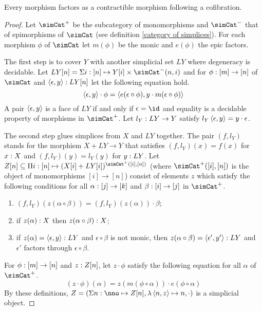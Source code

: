 \documentclass[csh.tex]{subfiles}
\begin{document}
\begin{proposition} Every morphism factors as a contractible morphism following a cofibration. \label{factor1} \end{proposition}

\begin{proof}
Let $\simCat^+$ be the subcategory of monomorphisms and $\simCat^-$ that of epimorphisms of $\simCat$ (see definition \ref{category of simplices}). For each morphism $\phi$ of $\simCat$ let $m(\phi)$ be the monic and $e(\phi)$ the epic factors.

The first step is to cover $Y$ with another simplicial set $LY$ where degeneracy is decidable.
Let $LY[n] = \coproduct{i\of[n]}{Y[i]\times\simCat^-(n,i)}$ and for $\phi: [m]\to [n]$ of $\simCat$ and $\left\langle \epsilon,y \right\rangle: LY[n]$ let the following equation hold.
\[\left\langle \epsilon,y \right\rangle\cdot \phi=\left\langle e(\epsilon\circ \phi),y\cdot m(\epsilon\circ\phi) \right\rangle\]
A pair $\left\langle \epsilon,y \right\rangle$ is a face of $LY$ if and only if $\epsilon=\id$ and equality is a decidable property of morphisms in $\simCat^+$.
Let $l_Y: LY\to Y$ satisfy $l_Y\left\langle \epsilon,y \right\rangle=y\cdot\epsilon$.


The second step glues simplices from $X$ and $LY$ together.
The pair $(f,l_Y)$ stands for the morphism $X+LY\to Y$ that satisfies $(f,l_Y)(x)=f(x)$ for $x: X$ and $(f,l_Y)(y) = l_Y(y)$ for $y: LY$.
Let $Z[n]\subseteq \product{i\of[n]}{(X[i]+LY[i])^{\simCat^+([i],[n])}}$ (where $\simCat^+([i],[n])$ is the object of monomorphisms $[i]\to [n]$) consist of elements $z$ which satisfy the following conditions for all $\alpha: [j]\to [k]$ and $\beta: [i]\to[j]$ in $\simCat^+$.
\begin{enumerate}
\item $(f,l_Y)(z(\alpha\circ\beta)) = (f,l_Y)(z(\alpha))\cdot\beta$;
\item if $z(\alpha): X$ then $z(\alpha\circ\beta): X$;
\item if $z(\alpha)=\left\langle \epsilon,y \right\rangle: LY$ and $\epsilon\circ\beta$ is not monic, then $z(\alpha\circ\beta) = \left\langle \epsilon',y' \right\rangle: LY$ and $\epsilon'$ factors through $\epsilon\circ\beta$.
\end{enumerate}
For $\phi:[m]\to [n]$ and $z: Z[n]$, let $z\cdot\phi$ satisfy the following equation for all $\alpha$ of $\simCat^+$.
\[ (z\cdot\phi)(\alpha) = z(m(\phi\circ\alpha))\cdot e(\phi\circ \alpha) \]
By these definitions, $Z=(\coproduct{n\of\nno}{Z[n]},\function{\tuplet{n,z}}n,\cdot)$ is a simplicial object.


\end{proof}
\end{document}
